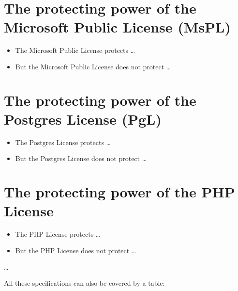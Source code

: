 \section{The protecting power of the Microsoft Public License (MsPL)}
\begin{itemize} 
  \item The Microsoft Public License protects \ldots
  \item But the Microsoft Public License does not protect \ldots
\end{itemize}

\section{The protecting power of the Postgres License (PgL)}
\begin{itemize} 
  \item The Postgres License protects \ldots
  \item But the Postgres License does not protect \ldots
\end{itemize}

\section{The protecting power of the PHP License}
\begin{itemize} 
  \item The PHP License protects \ldots
  \item But the PHP License does not protect \ldots
\end{itemize}  
 
\ldots

All these specifications can also be covered by a table:

